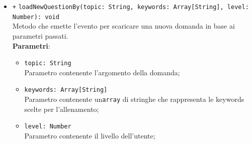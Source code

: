 \begin{itemize}
\begin{itemize}
\begin{itemize}
			\end{itemize}
			\item \texttt{+} \texttt{loadNewQuestionBy(topic: String, keywords: Array[String], level: Number): void} \\
			Metodo che emette l'evento per scaricare una nuova domanda in base ai parametri passati. \\
			\textbf{Parametri}:
			\begin{itemize}
				\item \texttt{topic: String} \\
				Parametro contenente l'argomento della domanda;
				\item \texttt{keywords: Array[String]} \\
				Parametro contenente un\texttt{array} di stringhe che rappresenta le keywords scelte per l'allenamento;
				\item \texttt{level: Number} \\
				Parametro contenente il livello dell'utente;
			\end{itemize}
		\end{itemize}
	\end{itemize}
	
	